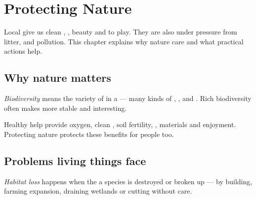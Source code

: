 \chapter{Protecting Nature}\label{ch:g4:protecting}

Local  give us clean , , beauty and  to play.
They are also under pressure from litter,  and pollution.
This chapter explains why nature  care and what practical actions
help.

\section{Why nature matters}

\begin{definition}[Biodiversity]\label{def:g4:protecting:biodiversity}
\emph{Biodiversity} means the variety of  in a  --- many kinds of , ,  and
. Rich biodiversity often makes  more stable and
interesting.
\end{definition}

\begin{proposition}\label{prop:g4:protecting:services}
Healthy  help provide oxygen, clean , soil fertility,
, materials and enjoyment. Protecting nature protects these
benefits for people too.
\end{proposition}
\admitted


\section{Problems living things face}

\begin{definition}\label{def:g4:protecting:habitat-loss}
\emph{Habitat loss} happens when the  a
species  is destroyed or broken up --- by building, farming
expansion, draining wetlands or cutting  without care.
\end{definition}

